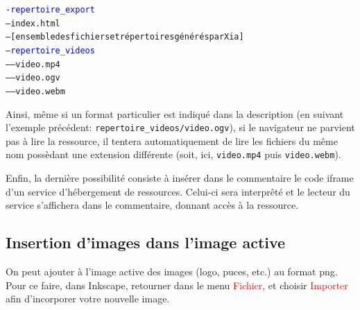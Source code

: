 \documentclass[a4paper,12pt]{report}
\newcommand{\chemin}[1]{\textcolor{red}{#1}}
\begin{document}
\begin{tikzpicture}
\end{tikzpicture}
\parbox{0.40\textwidth}
{
\begin{alltt}
 -\textcolor{blue}{repertoire\_export}\\
 ---index.html\\
 ---[ensemble des fichiers et répertoires générés par Xia]\\
 ---\textcolor{blue}{repertoire\_videos}\\
 -----video.mp4\\
 -----video.ogv\\
 -----video.webm\\
\end{alltt}
}


Ainsi, même si un format particulier est indiqué dans la description (en suivant l'exemple précédent: \verb|repertoire_videos/video.ogv|),
si le navigateur ne parvient pas à lire la ressource, il tentera automatiquement de lire les fichiers du même nom 
possèdant une extension différente (soit, ici, \verb|video.mp4| puis \verb|video.webm|).

Enfin, la dernière possibilité consiste à insérer dans le commentaire le code iframe d'un service d'hébergement de ressources.
Celui-ci sera interprêté et le lecteur du service s'affichera dans le commentaire, donnant accès à la ressource.

\subsection{Insertion d'images dans l'image active}\label{insertion_images}

On peut ajouter à l'image active des images (logo, puces, etc.) au format png.
Pour ce faire, dans Inkscape, retourner dans le menu \chemin{Fichier}, et choisir \chemin{Importer}
afin d'incorporer votre nouvelle image.
\end{document}
